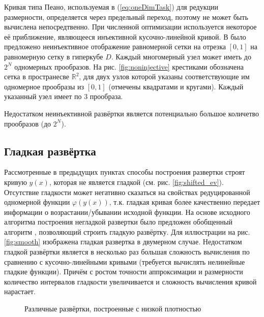Кривая типа Пеано, используемая в (\ref{eq:oneDimTask}) для редукции размерности, определяется через предельный переход,
поэтому не может быть вычислена непосредтвенно. При численной оптимизации используется некоторое её приближение, являющееся
инъективной кусочно-линейной кривой. В \cite{strongin1978} было предложено неинъективное отображение равномерной сетки на
отрезка $[0,1]$ на равномерную сетку в гиперкубе $D$. Каждый многомерный узел может иметь до $2^N$ одномерных прообразов.
На рис. \ref{fig:noninjective} крестиками обозначена сетка в пространесве $\mathbb{R}^2$, для двух узлов которой
указаны соответствующие им одномерное прообразы из $[0,1]$ (отмечены квадратами и кругами). Каждый указанный узел имеет по 3 прообраза.

Недостатком неинъективной развёртки является потенциально большое количетво прообразов (до $2^N$).


\subsection{Гладкая развёртка}

Рассмотренные в предыдущих пунктах способы построения развертки строят кривую $y(x)$, которая не является
гладкой (см. рис. \ref{fig:shifted_ev}). Отсутствие гладкости может негативно сказаться на свойствах редуцированной
одномерной функции $\varphi(y(x))$, т.к. гладкая кривая более качественно передает информации о возрастании/убывании
исходной функции. На основе исходного алгоритма построения негладкой развертки было предложен обобщенный алгоритм
\cite{Goryachih2017}, позволяющий строить гладкую развёртку. Для иллюстрации на рис. \ref{fig:smooth} изображена гладкая
развертка в двумерном случае. Недостатком гладкой развёртки является в несколько раз большая сложность вычисления по
сравнению с кусочно-линейными кривыми (требуется вычислять нелинейные гладкие функции). Причём с ростом точности аппроксимации и
размерности количество интервалов гладкости увеличивается и сложность вычисления кривой нарастает.

\begin{figure}[ht]
    \centering
    \caption{Различные развёртки, построенные с низкой плотностью}
\end{figure}

